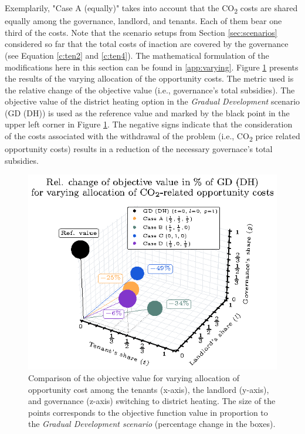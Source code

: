 Exemplarily, "Case A (equally)" takes into account that the CO\textsubscript{2} costs are shared equally among the governance, landlord, and tenants. Each of them bear one third of the costs. Note that the scenario setups from Section \ref{sec:scenarios} considered so far that the total costs of inaction are covered by the governance (see Equation \ref{c:ten2} and \ref{c:ten4}). The mathematical formulation of the modifications here in this section can be found in \ref{app:varying}. Figure \ref{fig:3dplot} presents the results of the varying allocation of the opportunity costs. The metric used is the relative change of the objective value (i.e., governance's total subsidies). The objective value of the district heating option in the \textit{Gradual Development} scenario (GD (DH)) is used as the reference value and marked by the black point in the upper left corner in Figure \ref{fig:3dplot}. The negative signs indicate that the consideration of the costs associated with the withdrawal of the problem (i.e., CO\textsubscript{2} price related opportunity costs) results in a reduction of the necessary governace's total subsidies.

\begin{figure}[h]
	\centering
	\includegraphics[width=0.75\linewidth]{figures/4_Results/fig_3d_plot/3d.eps}
	\caption{Comparison of the objective value for varying allocation of opportunity cost among the tenants (x-axis), the landlord (y-axis), and governance (z-axis) switching to district heating. The size of the points corresponds to the objective function value in proportion to the \textit{Gradual Development scenario} (percentage change in the boxes).}
	\label{fig:3dplot}
\end{figure}


